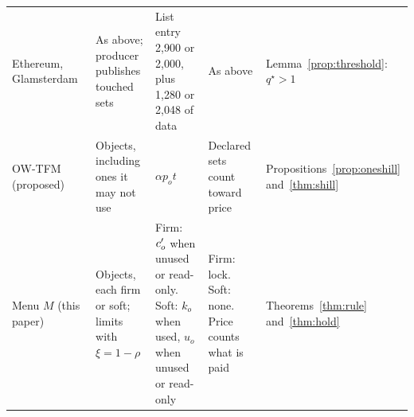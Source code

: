 \begin{table}[t]
\begin{tabular}{@{}l>{\raggedright\arraybackslash}p{2.8cm}>{\raggedright\arraybackslash}p{4.2cm}>{\raggedright\arraybackslash}p{3.2cm}>{\raggedright\arraybackslash}p{2.5cm}@{}}
Ethereum, Glamsterdam~\cite{eip8038,eip7981,eip7928} & As above; producer publishes touched sets & List entry 2,900 or 2,000, plus 1,280 or 2,048 of data & As above & Lemma~\ref{prop:threshold}: $q^\star > 1$ \\
OW-TFM~\cite{wadhwa2026perils} (proposed) & Objects, including ones it may not use & $\alpha p_o t$ & Declared sets count toward price & Propositions~\ref{prop:oneshill} and~\ref{thm:shill} \\
Menu $M$ (this paper) & Objects, each firm or soft; limits with $\xi = 1-\rho$ & Firm: $c'_o$ when unused or read-only. Soft: $k_o$ when used, $u_o$ when unused or read-only & Firm: lock. Soft: none. Price counts what is paid & Theorems~\ref{thm:rule} and~\ref{thm:hold} \\
\bottomrule
\end{tabular}
\end{table}
